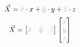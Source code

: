 \documentclass[preview]{standalone}
\begin{document}
$$\vec{X} = \textcolor[HTML]{f59789}{\hat{x}}\cdot x + \textcolor[HTML]{7dc98c}{\hat{y}}\cdot y + \textcolor[HTML]{96b1fe}{\hat{z}}\cdot z$$
$$\vec{X} = \begin{bmatrix}\textcolor[HTML]{f59789}{\hat{x}}&\textcolor[HTML]{7dc98c}{\hat{y}}&\textcolor[HTML]{96b1fe}{\hat{z}}\end{bmatrix}\begin{bmatrix}\textcolor[HTML]{f59789}{x}\\\textcolor[HTML]{7dc98c}{y}\\\textcolor[HTML]{96b1fe}{z}\end{bmatrix}$$
\end{document}
